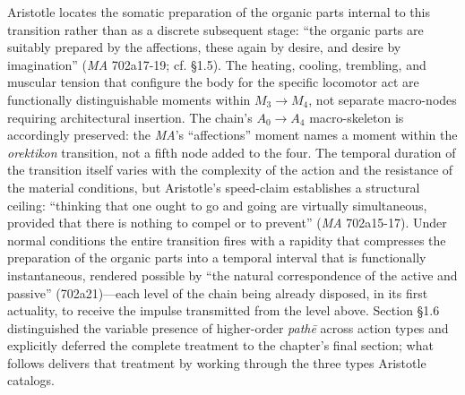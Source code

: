 Aristotle locates the somatic preparation of the organic parts internal to this transition rather than as a discrete subsequent stage: ``the organic parts are suitably prepared by the affections, these again by desire, and desire by imagination'' (\textit{MA} 702a17-19; cf. \S 1.5). The heating, cooling, trembling, and muscular tension that configure the body for the specific locomotor act are functionally distinguishable moments within $M_3 \rightarrow M_4$, not separate macro-nodes requiring architectural insertion. The chain's $A_0 \rightarrow A_4$ macro-skeleton is accordingly preserved: the \textit{MA}'s ``affections'' moment names a moment within the \textit{orektikon} transition, not a fifth node added to the four. The temporal duration of the transition itself varies with the complexity of the action and the resistance of the material conditions, but Aristotle's speed-claim establishes a structural ceiling: ``thinking that one ought to go and going are virtually simultaneous, provided that there is nothing to compel or to prevent'' (\textit{MA} 702a15-17). Under normal conditions the entire transition fires with a rapidity that compresses the preparation of the organic parts into a temporal interval that is functionally instantaneous, rendered possible by ``the natural correspondence of the active and passive'' (702a21)---each level of the chain being already disposed, in its first actuality, to receive the impulse transmitted from the level above. Section \S 1.6 distinguished the variable presence of higher-order \textit{pathē} across action types and explicitly deferred the complete treatment to the chapter's final section; what follows delivers that treatment by working through the three types Aristotle catalogs.


